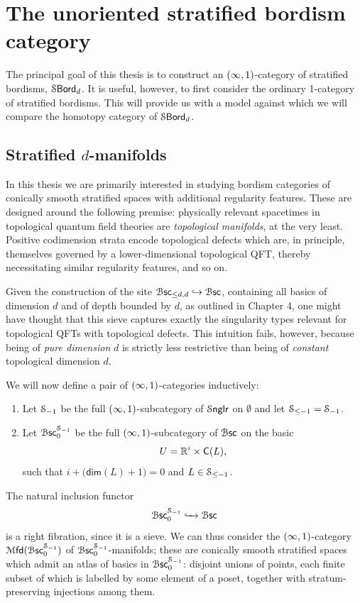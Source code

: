 \section{The unoriented stratified bordism category}

The principal goal of this thesis is to construct an $(\operatorname{\infty},1)$-category of stratified bordisms, $\operatorname{\mathcal S\mathsf{Bord}}_d$. It is useful, however, to first consider the ordinary 1-category of stratified bordisms. This will provide us with a model against which we will compare the homotopy category of $\operatorname{\mathcal S\mathsf{Bord}}_d$.

\subsection{Stratified \texorpdfstring{$d$}{d}-manifolds}

In this thesis we are primarily interested in studying bordism categories of conically smooth stratified spaces with additional regularity features. These are designed around the following premise: physically relevant spacetimes in topological quantum field theories are \emph{topological manifolds}, at the very least. Positive codimension strata encode topological defects which are, in principle, themselves governed by a lower-dimensional topological QFT, thereby necessitating similar regularity features, and so on.

Given the construction of the site $\operatorname{\mathcal B\mathsf{sc}}_{\leq d,d} \hookrightarrow \operatorname{\mathcal B\mathsf{sc}}$, containing all basics of dimension $d$ and of depth bounded by $d$, as outlined in Chapter 4, one might have thought that this sieve captures exactly the singularity types relevant for topological QFTs with topological defects. This intuition fails, however, because being of \emph{pure dimension} $d$ is strictly less restrictive than being of \emph{constant} topological dimension $d$.   

We will now define a pair of $(\operatorname{\infty},1)$-categories inductively: 
\begin{enumerate}
    \item Let $\mathcal S_{-1}$ be the full $(\operatorname{\infty},1)$-subcategory of $\operatorname{\mathcal S{\sf nglr}}$ on $\emptyset$ and let $\mathcal S_{\leq -1} = \mathcal S_{-1}$.
    \item Let $\operatorname{\mathcal B\mathsf{sc}}_{0}^{\mathcal S_{-1}}$ be the full $(\operatorname{\infty},1)$-subcategory of $\operatorname{\mathcal B\mathsf{sc}}$ on the basic
    \begin{equation}
        U = \mathbb R^{i}\times \mathsf C(L),
    \end{equation}
    such that $i + \big(\mathsf{dim}(L)+1\big) = 0$ and $L\in \mathcal S_{\leq -1}$.
\end{enumerate}
The natural inclusion functor  
\begin{equation}
    \operatorname{\mathcal B\mathsf{sc}}_{0}^{\mathcal S_{-1}} \xhookrightarrow{\,\,\,\,\,\,} \operatorname{\mathcal B\mathsf{sc}}
\end{equation}
is a right fibration, since it is a sieve. We can thus consider the $(\operatorname{\infty},1)$-category $\operatorname{{\mathcal M}\mathsf{fd}}(\operatorname{\mathcal B\mathsf{sc}}_{0}^{\mathcal S_{-1}})$ of $\operatorname{\mathcal B\mathsf{sc}}_{0}^{\mathcal S_{-1}}$-manifolds; these are conically smooth stratified spaces which admit an atlas of basics in $\operatorname{\mathcal B\mathsf{sc}}_{0}^{\mathcal S_{-1}}$: disjoint unions of points, each finite subset of which is labelled by some element of a poset, together with stratum-preserving injections among them.


